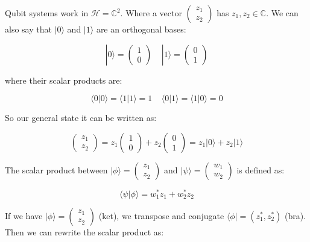\noindent Qubit systems work in $\mathcal{H}=\mathbb{C}^2$. Where a vector $\begin{pmatrix}z_1\\z_2\end{pmatrix}$ has $z_1,z_2\in\mathbb{C}$. We can also say that $|0\rangle$ and $|1\rangle$ are an orthogonal bases:

\begin{equation*}
    |0\rangle = \begin{pmatrix}1\\0\end{pmatrix} \ \ \ \ \ |1\rangle = \begin{pmatrix}0\\1\end{pmatrix}
\end{equation*}

\noindent where their scalar products are:

\begin{equation*}
    \langle0|0\rangle=\langle1|1\rangle=1 \ \ \ \ \ \langle0|1\rangle=\langle1|0\rangle=0
\end{equation*}

\noindent So our general state it can be written as:

\begin{equation*}
    \begin{pmatrix}z_1\\z_2\end{pmatrix}=z_1\begin{pmatrix}1\\0\end{pmatrix} + z_2\begin{pmatrix}0\\1\end{pmatrix}=z_1|0\rangle+z_2|1\rangle
\end{equation*}

\noindent The scalar product between $|\phi\rangle=\begin{pmatrix}z_1\\z_2\end{pmatrix}$ and $|\psi\rangle=\begin{pmatrix}w_1\\w_2\end{pmatrix}$ is defined as:

\begin{equation*}
    \langle\psi|\phi\rangle=w_1^*z_1+w_2^*z_2
\end{equation*}

\noindent If we have $|\phi\rangle = \begin{pmatrix}z_1\\z_2\end{pmatrix}$ (ket), we transpose and conjugate $\langle\phi|=(z_1^*, z_2^*)$ (bra). Then we can rewrite the scalar product as:

